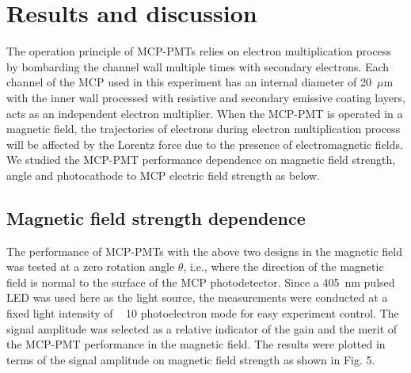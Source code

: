 \documentclass[preprint,5p]{elsarticle}
\begin{document}
\section{Results and discussion} \label{}
The operation principle of MCP-PMTs relies on electron multiplication process 
by bombarding the channel wall multiple times with secondary electrons. Each 
channel of the MCP used in this experiment has an internal diameter of 
20~$\mu$m with the inner wall processed with resistive and secondary emissive 
coating layers, acts as an independent electron multiplier. When the MCP-PMT is 
operated in a magnetic field, the trajectories of electrons during electron 
multiplication process will be affected by the Lorentz force due to the 
presence of electromagnetic fields. We studied the MCP-PMT performance 
dependence on magnetic field strength, angle and photocathode to MCP electric 
field strength as below. 

\subsection{Magnetic field strength dependence} \label{}
The performance of MCP-PMTs with the above two designs in the magnetic field 
was tested at a zero rotation angle $\theta$, i.e., where the direction of the 
magnetic field is normal to the surface of the MCP photodetector. Since a 
405~nm pulsed LED was used here as the light source, the measurements were 
conducted at a fixed light intensity of ~ 10 photoelectron mode for easy 
experiment control.  The signal amplitude was selected as a relative indicator 
of the gain and the merit of the MCP-PMT performance in the magnetic field.  
The results were plotted in terms of the signal amplitude on magnetic field 
strength as shown in Fig. 5. 
\end{document}
